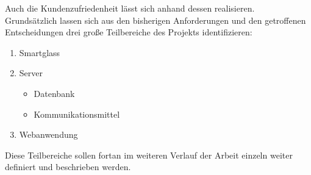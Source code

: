 Auch die Kundenzufriedenheit lässt sich anhand dessen realisieren. 
\\
Grundsätzlich lassen sich aus den bisherigen Anforderungen und den getroffenen Entscheidungen drei große Teilbereiche des Projekts identifizieren: 
\begin{enumerate}
	\item Smartglass
	\item Server
	\begin{itemize}
		\item Datenbank
		\item Kommunikationsmittel
	\end{itemize}
	\item Webanwendung
\end{enumerate}
Diese Teilbereiche sollen fortan im weiteren Verlauf der Arbeit einzeln weiter definiert und beschrieben werden.

